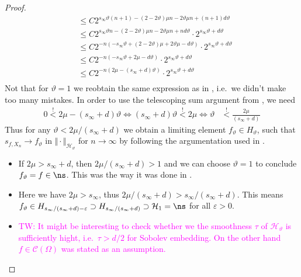 \documentclass[a4paper, 10pt]{article}
\newcommand{\Ht}{\mathcal{H}_{\vartheta}}
\newcommand{\tw}[1]{\textcolor{magenta}{TW: #1}}
\begin{document}
\begin{proof}
\begin{align*}
&\leq C 2^{s_\infty \vartheta (n+1) -(2-2\vartheta)\mu n -2\vartheta \mu n + (n+1)d \vartheta} \\
&\leq C 2^{s_\infty \vartheta n -(2-2\vartheta)\mu n -2\vartheta \mu n + n d \vartheta} \cdot 2^{s_\infty \vartheta + d \vartheta} \\
&\leq C 2^{-n(-s_\infty \vartheta + (2-2\vartheta)\mu + 2\vartheta \mu  - d \vartheta)} \cdot 2^{s_\infty \vartheta + d \vartheta} \\
&\leq C 2^{-n(-s_\infty \vartheta + 2\mu - d \vartheta)} \cdot 2^{s_\infty \vartheta + d \vartheta} \\
&\leq C 2^{-n(2\mu -(s_\infty + d) \vartheta)} \cdot 2^{s_\infty \vartheta + d \vartheta} \\
\end{align*}
Not that for $\vartheta = 1$ we reobtain the same expression as in \cite{schaback2002inverse}, i.e.\ we didn't make too many mistakes.
In order to use the telescoping sum argument from \cite{schaback2002inverse}, we need
\begin{align*}
0 \stackrel{!}{<} 2\mu -(s_\infty + d) \vartheta \Leftrightarrow (s_\infty + d) \vartheta \stackrel{!}{<} 2\mu 
\Leftrightarrow \vartheta &\stackrel{!}{<} \frac{2\mu}{(s_\infty + d)}
\end{align*}
Thus for any $\vartheta < 2\mu / (s_\infty + d)$ we obtain a limiting element $f_\vartheta \in H_\vartheta$,
such that $s_{f, X_n} \rightarrow f_\vartheta$ in $\Vert \cdot \Vert_{\Ht}$ for $n \rightarrow \infty$ by following the argumentation used in \cite{schaback2002inverse}.
\begin{itemize}
\item If $2\mu > s_{\infty} + d$, then $ 2\mu / (s_\infty + d) > 1$ and we can choose $\vartheta = 1$ to conclude $f_\vartheta = f \in \ns$. 
This was the way it was done in \cite{schaback2002inverse}.
\item Here we have $2\mu > s_{\infty}$, thus $ 2\mu / (s_\infty + d) > s_\infty / (s_\infty + d)$. This means $f_\vartheta \in H_{s_\infty / (s_\infty + d) - \varepsilon} \supset H_{s_\infty / (s_\infty + d)} \supset \mathcal{H}_1 = \ns$ for all $\varepsilon > 0$.
\item \tw{It might be interesting to check whether we the smoothness $\tau$ of $\Ht$ is sufficiently hight, i.e.\ $\tau > d/2$ for Sobolev embedding.
On the other hand $f \in \mathcal{C}(\Omega)$ was stated as an assumption.} 
%
%
%
%
%
%
%
%
%
%
\end{itemize}


\end{proof}
\end{document}
